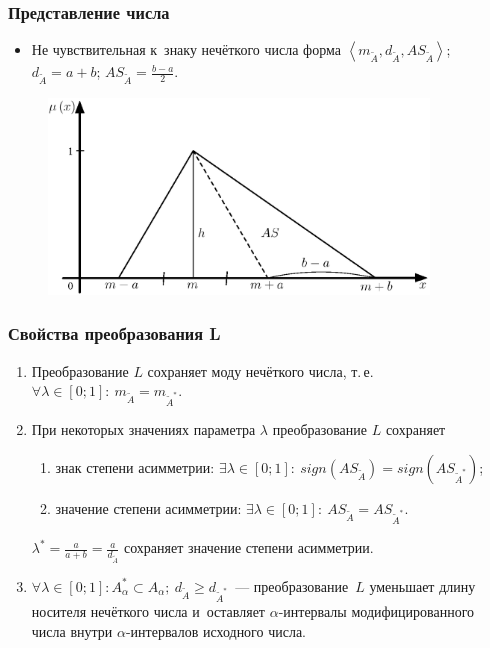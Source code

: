 \documentclass[12pt]{beamer}
\begin{document}

\begin{frame}
  \frametitle{Представление числа}
  \begin{itemize}
    \item Не чувствительная к~знаку нечёткого числа форма  $\left\langle m_{\tilde A}, d_{\tilde A}, AS_{\tilde A} \right\rangle$; $d_{\tilde A} = a+b$; $\displaystyle AS_{\tilde A} = \frac{b-a}{2}$.
  \end{itemize}
  \begin{figure}[h]
    \includegraphics[width=0.9\textwidth]{as-degree}
  \end{figure}
\end{frame}


\begin{frame}
  \frametitle{Свойства преобразования L}
  \begin{enumerate}
    \item Преобразование $L$ сохраняет моду нечёткого числа, т.\,е. $\forall \lambda \in \left[ 0;1 \right]:\ m_{\tilde A}=m_{\tilde A^{*}}$.
    \item При некоторых значениях параметра $\lambda$ преобразование $L$ сохраняет
      \begin{enumerate}
        \item знак степени асимметрии: $\exists \lambda \in [0;1]:\ sign(AS_{\tilde A})=sign(AS_{\tilde A^{*}})$;
        \item значение степени асимметрии: $\exists \lambda \in [0;1]:\ AS_{\tilde A}=AS_{\tilde A^{*}}$.
      \end{enumerate}
      $\displaystyle \lambda^* =\frac{a}{a+b}=\frac{a}{d_{\tilde A}}$ сохраняет значение степени асимметрии.
    \item $\forall \lambda \in \left[ 0;1 \right]: A_{\alpha}^{*}\subset A_\alpha;\ d_{\tilde A} \geqslant d_{\tilde A^{*}}$~--- преобразование~$L$ уменьшает длину носителя нечёткого числа и~оставляет $\alpha$-интервалы модифицированного числа внутри $\alpha$-интервалов исходного числа.
  \end{enumerate}
\end{frame}
\end{document}
